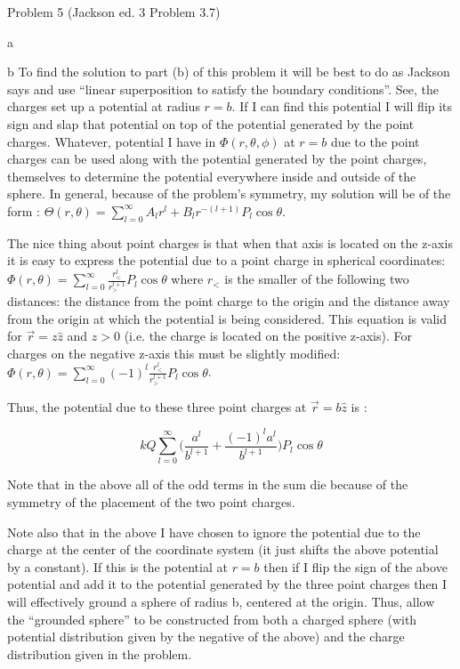 \begin{homeworkProblem}{Problem 5 (Jackson ed. 3 Problem 3.7)}
\begin{homeworkSection}{a}
\end{homeworkSection}

\begin{homeworkSection}{b}
To find the solution to part (b) of this problem it will be best to do as Jackson says and use ``linear superposition to satisfy the boundary conditions''. See, the charges set up a potential at radius $r = b$. If I can find this potential I will flip its sign and slap that potential on top of the potential generated by the point charges. Whatever, potential I have in $\Phi(r,\theta,\phi)$ at $r=b$ 
due to the point charges can be used along with the potential generated by the point charges, themselves to determine the potential everywhere inside and outside of the sphere. In general, because of the problem's symmetry, my solution will be of the form : $\Theta(r,\theta) = \sum\limits_{l=0}^{\infty} A_l r^l + B_l r^{-(l+1)} P_l\cos\theta$.

The nice thing about point charges is that when that axis is located on the z-axis it is easy to express the potential due to a point charge in spherical coordinates: $\Phi(r,\theta) = \sum\limits_{l=0}^{\infty} \frac{r_<^l}{r_>^{l+1}} P_l\cos\theta$ where $r_<$ is the smaller of the following two distances: the distance from the point charge to the origin and the distance away from the origin at which the potential is being considered. This equation is valid for $\vec{r} = z \hat{z}$ and $z > 0$ (i.e. the charge is located on the positive z-axis). For charges on the negative z-axis this must be slightly modified: $\Phi(r,\theta) = \sum\limits_{l=0}^{\infty} (-1)^l \frac{r_<^l}{r_>^{l+1}} P_l\cos\theta$.

Thus, the potential due to these three point charges at $\vec{r} = b \hat{z}$ is :

\[
kQ \sum\limits_{l=0}^{\infty}\Big(\frac{a^l}{b^{l+1}} + \frac{(-1)^l a^l}{b^{l+1}}\Big) P_l\cos\theta
\]

Note that in the above all of the odd terms in the sum die because of the symmetry of the placement of the two point charges.

Note also that in the above I have chosen to ignore the potential due to the charge at the center of the coordinate system (it just shifts the above potential by a constant). If this is the potential at $r = b$ then if I flip the sign of the above potential and add it to the potential generated by the three point charges then I will effectively ground a sphere of radius b, centered at the origin. Thus, allow the ``grounded sphere'' to be constructed from both a charged sphere (with potential distribution given by the negative of the above) and the charge distribution given in the problem.


\end{homeworkSection}
\end{homeworkProblem}
